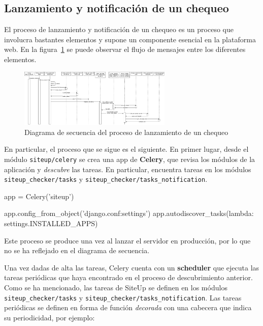 \subsection{Lanzamiento y notificación de un chequeo}

El proceso de lanzamiento y notificación de un chequeo es un proceso que
involucra bastantes elementos y supone un componente esencial en la plataforma
web. En la figura~\ref{fig:secuencia-check} se puede observar el flujo de
mensajes entre los diferentes elementos.

\begin{figure}[p]
  \centering
  \includegraphics[angle=90, width=0.65\textwidth]{5_diseno/diag_secuencia_check}
  \caption{Diagrama de secuencia del proceso de lanzamiento de un chequeo}    
  \label{fig:secuencia-check}
\end{figure}

En particular, el proceso que se sigue es el siguiente. En primer lugar, desde
el módulo \texttt{siteup/celery} se crea una app de \textbf{Celery}, que revisa
los módulos de la aplicación y \textit{descubre} las tareas. En particular,
encuentra tareas en los módulos \texttt{siteup\_checker/tasks} y
\texttt{siteup\_checker/tasks\_notification}. 

\begin{pythoncode}
app = Celery('siteup')

app.config_from_object('django.conf:settings')
app.autodiscover_tasks(lambda: settings.INSTALLED_APPS) 
\end{pythoncode}

Este proceso se produce una vez al lanzar el servidor en
producción, por lo que no se ha reflejado en el diagrama de secuencia.

Una vez dadas de alta las tareas, Celery cuenta con un \textbf{scheduler} que
ejecuta las tareas periódicas que haya encontrado en el proceso de
descubrimiento anterior. Como se ha mencionado, las tareas de SiteUp se definen
en los módulos \texttt{siteup\_checker/tasks} y
\texttt{siteup\_checker/tasks\_notification}. Las tareas periódicas se definen
en forma de función \textit{decorada} con una cabecera que indica su
periodicidad, por ejemplo:


